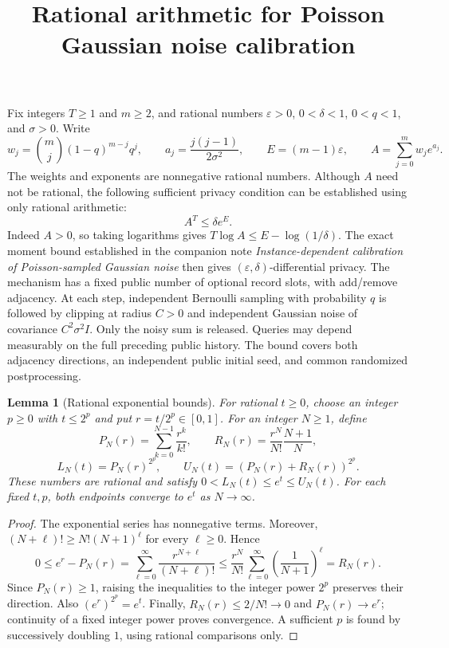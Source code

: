 \documentclass[11pt]{article}
\title{Rational arithmetic for Poisson Gaussian noise calibration}
\author{}\date{}
\newtheorem{lemma}[theorem]{Lemma}
\begin{document}
\maketitle

Fix integers $T\ge1$ and $m\ge2$, and rational numbers
$\varepsilon>0$, $0<\delta<1$, $0<q<1$, and $\sigma>0$.
Write
\[
 w_j=\binom mj(1-q)^{m-j}q^j,\qquad
 a_j=\frac{j(j-1)}{2\sigma^2},\qquad E=(m-1)\varepsilon,
 \qquad A=\sum_{j=0}^m w_j e^{a_j}.
\]
The weights and exponents are nonnegative rational numbers. Although $A$
need not be rational, the following sufficient privacy condition can be
established using only rational arithmetic:
\begin{equation}\label{eq:real}
 A^T\le\delta e^E.
\end{equation}
Indeed $A>0$, so taking logarithms gives
$T\log A\le E-\log(1/\delta)$.
The exact moment bound established in the companion note
\emph{Instance-dependent calibration of Poisson-sampled Gaussian noise}
then gives $(\varepsilon,\delta)$-differential privacy.
The mechanism has a fixed public number of optional record slots, with
add/remove adjacency. At each step, independent Bernoulli sampling with
probability $q$ is followed by clipping at radius $C>0$ and independent
Gaussian noise of covariance $C^2\sigma^2 I$. Only the noisy sum is released.
Queries may depend measurably on the full preceding public history. The
bound covers both adjacency directions, an independent public initial seed,
and common randomized postprocessing.

\begin{lemma}[Rational exponential bounds]\label{lem:exp}
For rational $t\ge0$, choose an integer $p\ge0$ with $t\le2^p$ and put
$r=t/2^p\in[0,1]$. For an integer $N\ge1$, define
\[
 P_N(r)=\sum_{k=0}^{N-1}\frac{r^k}{k!},\qquad
 R_N(r)=\frac{r^N}{N!}\frac{N+1}{N},
\]
\[
 L_N(t)=P_N(r)^{2^p},\qquad
 U_N(t)=(P_N(r)+R_N(r))^{2^p}.
\]
These numbers are rational and satisfy
$0<L_N(t)\le e^t\le U_N(t)$.
For each fixed $t,p$, both endpoints converge to $e^t$ as $N\to\infty$.
\end{lemma}
\begin{proof}
The exponential series has nonnegative terms. Moreover,
$(N+\ell)!\ge N!(N+1)^\ell$ for every $\ell\ge0$. Hence
\[
 0\le e^r-P_N(r)
 =\sum_{\ell=0}^{\infty}\frac{r^{N+\ell}}{(N+\ell)!}
 \le\frac{r^N}{N!}\sum_{\ell=0}^{\infty}
       \left(\frac1{N+1}\right)^\ell
 =R_N(r).
\]
Since $P_N(r)\ge1$, raising the inequalities to the integer power $2^p$
preserves their direction. Also $(e^r)^{2^p}=e^t$. Finally,
$R_N(r)\le2/N!\to0$ and $P_N(r)\to e^r$; continuity of a fixed integer
power proves convergence. A sufficient $p$ is found by successively
doubling $1$, using rational comparisons only.
\end{proof}
\end{document}
